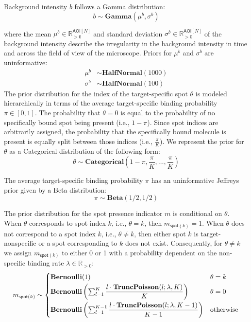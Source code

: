 Background intensity $b$ follows a Gamma distribution:
%
\begin{equation}
    b \sim \mathbf{Gamma}(\mu^b, \sigma^b)
\end{equation}

\noindent
where the mean $\mu^b \in \mathbb{R}_{>0}^{\mathsf{AOI}[N]}$ and standard deviation $\sigma^b \in \mathbb{R}_{>0}^{\mathsf{AOI}[N]}$ of the background intensity describe the irregularity in the background intensity in time and across the field of view of the microscope. Priors for $\mu^b$ and $\sigma^b$ are uninformative:
%
\begin{subequations}
\begin{align}
    \mu^b &\sim \mathbf{HalfNormal}(1000) \\
    \sigma^b &\sim \mathbf{HalfNormal}(100)
\end{align}
\end{subequations}
%
The prior distribution for the index of the target-specific spot $\theta$ is modeled hierarchically in terms of the average target-specific binding probability $\pi \in [0, 1] $. The probability that $\theta = 0$ is equal to the probability of no specifically bound spot being present (i.e., $1-\pi$). Since spot indices are arbitrarily assigned, the probability that the specifically bound molecule is present is equally split between those indices (i.e., $\frac{\pi}{K}$). We represent the prior for $\theta$ as a Categorical distribution of the following form:
%
\begin{equation}
    \theta \sim \mathbf{Categorical}\left(1 - \pi, \frac{\pi}{K}, \dots, \frac{\pi}{K}\right)
\end{equation}

The average target-specific binding probability $\pi$ has an uninformative Jeffreys prior \citep{Gelman2013-ro} given by a Beta distribution:
%
\begin{equation}
    \pi \sim \mathbf{Beta}(1/2, 1/2)
\end{equation}

The prior distribution for the spot presence indicator $m$ is conditional on $\theta$. When $\theta$ corresponds to spot index $k$, i.e., $\theta = k$, then $m_{\mathsf{spot}(k)} = 1$. When $\theta$ does not correspond to a spot index $k$, i.e., $\theta \neq k$, then either spot $k$ is target-nonspecific or a spot corresponding to $k$ does not exist. Consequently, for $\theta \neq k$ we assign $m_{\mathsf{spot}(k)}$ to either 0 or 1 with a probability dependent on the non-specific binding rate $\lambda \in \mathbb{R}_{>0}$:
%
\begin{equation}
    m_{\mathsf{spot}(k)} \sim
    \begin{cases}
        \mathbf{Bernoulli}(1) & \text{$\theta = k$} \\
        \mathbf{Bernoulli} \left( \sum_{l=1}^K \dfrac{l \cdot \mathbf{TruncPoisson}(l; \lambda, K)}{K} \right) & \text{$\theta = 0$} \rule{0pt}{4ex} \\
        \mathbf{Bernoulli} \left( \sum_{l=1}^{K-1} \dfrac{l \cdot \mathbf{TruncPoisson}(l; \lambda, K-1)}{K-1} \right) & \text{otherwise} \rule{0pt}{4ex}
    \end{cases}
\end{equation}


